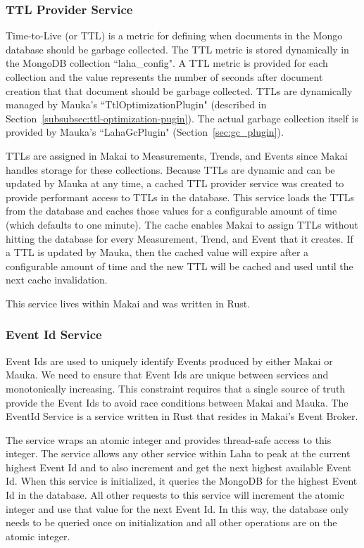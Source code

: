 \subsubsection{TTL Provider Service}
Time-to-Live (or TTL) is a metric for defining when documents in the Mongo database should be garbage collected. The TTL metric is stored dynamically in the MongoDB collection ``laha\_config". A TTL metric is provided for each collection and the value represents the number of seconds after document creation that that document should be garbage collected. TTLs are dynamically managed by Mauka's ``TtlOptimizationPlugin" (described in Section~\ref{subsubsec:ttl-optimization-pugin}). The actual garbage collection itself is provided by Mauka's ``LahaGcPlugin" (Section~\ref{sec:gc_plugin}).

TTLs are assigned in Makai to Measurements, Trends, and Events since Makai handles storage for these collections. Because TTLs are dynamic and can be updated by Mauka at any time, a cached TTL provider service was created to provide performant access to TTLs in the database. This service loads the TTLs from the database and caches those values for a configurable amount of time (which defaults to one minute). The cache enables Makai to assign TTLs without hitting the database for every Measurement, Trend, and Event that it creates. If a TTL is updated by Mauka, then the cached value will expire after a configurable amount of time and the new TTL will be cached and used until the next cache invalidation.

This service lives within Makai and was written in Rust.

\subsubsection{Event Id Service}
Event Ids are used to uniquely identify Events produced by either Makai or Mauka. We need to ensure that Event Ids are unique between services and monotonically increasing. This constraint requires that a single source of truth provide the Event Ids to avoid race conditions between Makai and Mauka. The EventId Service is a service written in Rust that resides in Makai's Event Broker.

The service wraps an atomic integer and provides thread-safe access to this integer. The service allows any other service within Laha to peak at the current highest Event Id and to also increment and get the next highest available Event Id. When this service is initialized, it queries the MongoDB for the highest Event Id in the database. All other requests to this service will increment the atomic integer and use that value for the next Event Id. In this way, the database only needs to be queried once on initialization and all other operations are on the atomic integer.


